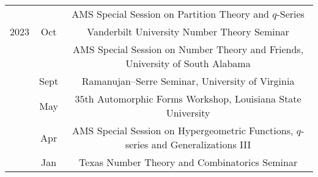 \documentclass[11pt]{amsart}
\theoremstyle{remark}
\begin{document}
{{{\begin{tabular}{ c c c }
& &\hspace{-2.05in}AMS Special Session on Partition Theory and $q$-Series \\
2023 & Oct &  \hspace{-2.6in}Vanderbilt University Number Theory Seminar\\
&&AMS Special Session on Number Theory and Friends, University of South Alabama \\
& Sept & \hspace{-2.4in}Ramanujan--Serre Seminar, University of Virginia\\
& May & \hspace{-1.44in} $35$th Automorphic Forms Workshop, Louisiana State University \\
& Apr & AMS Special Session on Hypergeometric Functions, $q$-series and Generalizations III \\
& Jan & \hspace{-2.43in} Texas Number Theory and Combinatorics Seminar \\

\end{tabular}}}}
\end{document}
